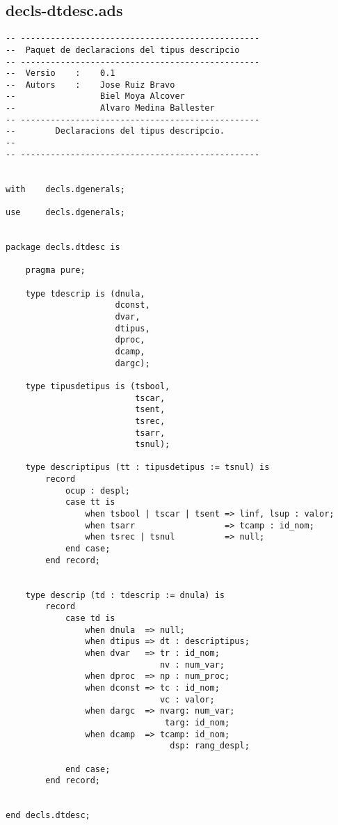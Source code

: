 \documentclass[10pt]{report}
\begin{document}
    \subsection{decls-dtdesc.ads}
    \begin{lstlisting}[style=Ada]
-- ------------------------------------------------
--  Paquet de declaracions del tipus descripcio
-- ------------------------------------------------
--  Versio    :    0.1
--  Autors    :    Jose Ruiz Bravo
--                 Biel Moya Alcover
--                 Alvaro Medina Ballester
-- ------------------------------------------------
--        Declaracions del tipus descripcio.
--
-- ------------------------------------------------


with    decls.dgenerals;

use     decls.dgenerals;


package decls.dtdesc is

    pragma pure;

    type tdescrip is (dnula,
                      dconst,
                      dvar,
                      dtipus,
                      dproc,
                      dcamp,
                      dargc);
                       
    type tipusdetipus is (tsbool,
                          tscar,
                          tsent,
                          tsrec,
                          tsarr,
                          tsnul);
    
    type descriptipus (tt : tipusdetipus := tsnul) is
        record
            ocup : despl;
            case tt is
                when tsbool | tscar | tsent => linf, lsup : valor;
                when tsarr                  => tcamp : id_nom;
                when tsrec | tsnul          => null;
            end case;
        end record;
        
    
    type descrip (td : tdescrip := dnula) is
        record
            case td is
                when dnula  => null;
                when dtipus => dt : descriptipus;
                when dvar   => tr : id_nom;
                               nv : num_var;
                when dproc  => np : num_proc;
                when dconst => tc : id_nom;
                               vc : valor;
                when dargc  => nvarg: num_var;
                                targ: id_nom;
                when dcamp  => tcamp: id_nom;
                                 dsp: rang_despl; 

            end case;
        end record;
    
        
end decls.dtdesc;
    \end{lstlisting}
    
\end{document}
